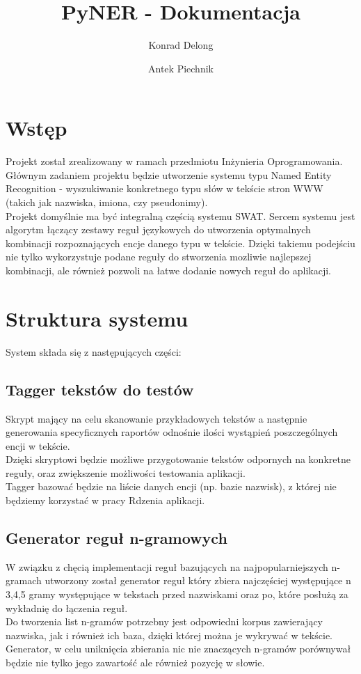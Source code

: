 \documentclass[12pt]{article}
\author{Konrad Delong \and Antek Piechnik}
\title{PyNER - Dokumentacja}
\begin{document}
\maketitle
\tableofcontents
\newpage

\section{Wstęp}
Projekt został zrealizowany w ramach przedmiotu Inżynieria Oprogramowania. Głównym zadaniem projektu będzie utworzenie systemu typu Named Entity Recognition - wyszukiwanie konkretnego typu słów w tekście stron WWW (takich jak nazwiska, imiona, czy pseudonimy). 
\\Projekt domyślnie ma być integralną częścią systemu SWAT. Sercem systemu jest algorytm łączący zestawy reguł językowych do utworzenia optymalnych kombinacji rozpoznających encje danego typu w tekście. Dzięki takiemu podejściu nie tylko wykorzystuje podane reguły do stworzenia mozliwie najlepszej kombinacji, ale również pozwoli na łatwe dodanie nowych reguł do aplikacji.

\section{Struktura systemu}
System składa się z następujących części:

\subsection{Tagger tekstów do testów}
Skrypt mający na celu skanowanie przykładowych tekstów a następnie generowania specyficznych raportów odnośnie ilości wystąpień poszczególnych encji w tekście.
\\Dzięki skryptowi będzie możliwe przygotowanie tekstów odpornych na konkretne reguły, oraz zwiększenie możliwości testowania aplikacji.
\\Tagger bazować będzie na liście danych encji (np. bazie nazwisk), z której nie będziemy korzystać w pracy Rdzenia aplikacji.

\subsection{Generator reguł n-gramowych}
W związku z chęcią implementacji reguł bazujących na najpopularniejszych n-gramach utworzony został generator reguł który zbiera najczęściej występujące n {3,4,5} gramy występujące w tekstach przed nazwiskami oraz po, które posłużą za wykładnię do łączenia reguł.
\\Do tworzenia list n-gramów potrzebny jest odpowiedni korpus zawierający nazwiska, jak i również ich baza, dzięki której można je wykrywać w tekście.
\\Generator, w celu uniknięcia zbierania nic nie znaczących n-gramów porównywał będzie nie tylko jego zawartość ale również pozycję w słowie.
\end{document}

